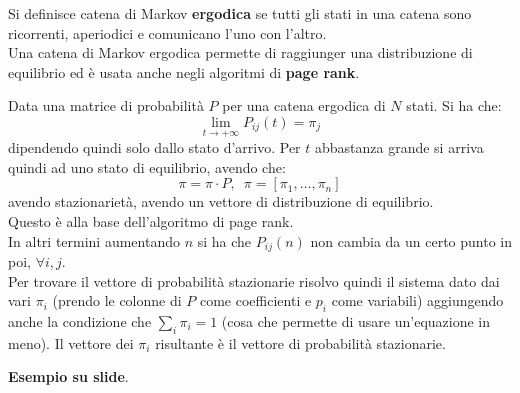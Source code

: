 \documentclass[a4paper,12pt, oneside]{book}
\begin{document}
\begin{definizione}
  Si definisce catena di Markov \textbf{ergodica} se tutti gli stati in una
  catena sono ricorrenti, aperiodici e comunicano l’uno con l’altro.\\
  Una catena di Markov ergodica permette di raggiunger una distribuzione di
  equilibrio ed è usata anche negli algoritmi di \textbf{page rank}.
\end{definizione}
\begin{teorema}
  Data una matrice di probabilità $P$ per una catena ergodica di $N$ stati. Si
  ha che:
  \[\lim_{t\to+\infty} P_{ij}(t)=\pi_j\]
  dipendendo quindi solo dallo stato d'arrivo. Per $t$ abbastanza grande si
  arriva quindi ad uno stato di equilibrio, avendo che:
  \[\pi=\pi\cdot P,\,\,\,\pi=[\pi_1,\ldots,\pi_n]\]
  avendo stazionarietà, avendo un vettore di distribuzione di equilibrio.\\
  Questo è alla base dell'algoritmo di page rank.\\
  In altri termini aumentando $n$ si ha che $P_{ij}(n)$ non cambia da un certo
  punto in poi, $\forall i,j$.\\
  Per trovare il vettore di probabilità stazionarie risolvo quindi il sistema
  dato dai vari $\pi_i$ (prendo le colonne di $P$ come coefficienti e $p_i$ come
  variabili) aggiungendo anche la condizione che $\sum_i \pi_i=1$ (cosa che
  permette di usare un'equazione in meno). Il vettore dei $\pi_i$ risultante è
  il vettore di probabilità stazionarie.
\end{teorema}
\textbf{Esempio su slide}.\\
\end{document}
